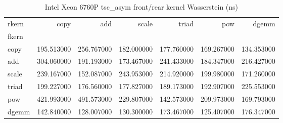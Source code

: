 \begin{table}
\caption{Intel Xeon 6760P tsc_asym front/rear kernel Wasserstein (ns)}
\begin{tabular}{lrrrrrr}
\toprule
rkern & copy & add & scale & triad & pow & dgemm \\
fkern &  &  &  &  &  &  \\
\midrule
copy & 195.513000 & 256.767000 & 182.000000 & 177.760000 & 169.267000 & 134.353000 \\
add & 304.060000 & 191.193000 & 173.467000 & 241.433000 & 184.347000 & 216.427000 \\
scale & 239.167000 & 152.087000 & 243.953000 & 214.920000 & 199.980000 & 171.260000 \\
triad & 199.227000 & 176.560000 & 177.827000 & 189.173000 & 192.907000 & 225.553000 \\
pow & 421.993000 & 491.573000 & 229.807000 & 142.573000 & 209.973000 & 169.793000 \\
dgemm & 142.840000 & 128.007000 & 130.300000 & 173.467000 & 125.407000 & 176.347000 \\
\bottomrule
\end{tabular}
\end{table}
